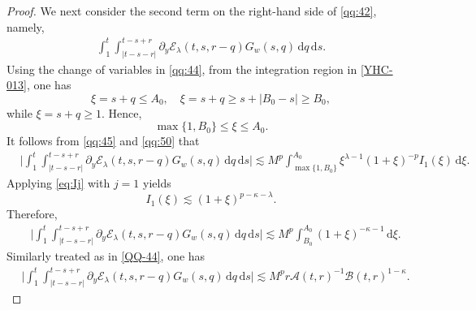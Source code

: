 \documentclass[11pt,twoside]{article}
\newcommand{\Acal}{\mathcal A}
\newcommand{\Bcal}{\mathcal B}
\newcommand{\dd}{\,\mathrm{d}}
\newcommand{\Ecal}{\mathcal E}
\theoremstyle{plain}
\theoremstyle{definition}
\theoremstyle{remark}
\numberwithin{equation}{section}
\begin{document}
\begin{proof}
We next consider the second term on the right-hand side of
\eqref{qq:42}, namely,
\begin{equation}\label{YHC-013}
\begin{aligned}
\int_1^t
\int_{|t-s-r|}^{t-s+r}
\partial_y\Ecal_\lambda(t,s,r-q)
G_w(s,q)\dd q\dd s .
\end{aligned}
\end{equation}
Using the change of variables in \eqref{qq:44},  from the integration region in \eqref{YHC-013}, one has
\[
\xi=s+q\leq A_0,
\quad
\xi=s+q\geq s+|B_0-s|\geq B_0,
\]
while $\xi=s+q\geq1$. Hence,
\[
\max\{1,B_0\}\leq\xi\leq A_0.
\]
It follows from \eqref{qq:45} and \eqref{qq:50} that
\begin{equation}
\label{qq:62}
\begin{aligned}
&
\big|
\int_1^t
\int_{|t-s-r|}^{t-s+r}
\partial_y\Ecal_\lambda(t,s,r-q)
G_w(s,q)\dd q\dd s
\big|
\lesssim
M^p
\int_{\max\{1,B_0\}}^{A_0}
\xi^{\lambda-1}
(1+\xi)^{-p}
I_1(\xi)
\dd\xi .
\end{aligned}
\end{equation}
Applying \eqref{eq:Ij} with $j=1$ yields
\[
I_1(\xi)
\lesssim
(1+\xi)^{p-\kappa-\lambda}.
\]
Therefore,
\begin{equation}
\label{qq:63}
\begin{aligned}
&
\big|
\int_1^t
\int_{|t-s-r|}^{t-s+r}
\partial_y\Ecal_\lambda(t,s,r-q)
G_w(s,q)\dd q\dd s
\big|
\lesssim
M^p
\int_{B_0}^{A_0}
(1+\xi)^{-\kappa-1}
\dd\xi .
\end{aligned}
\end{equation}
Similarly treated as in \eqref{QQ-44}, one has
\begin{equation}
\label{qq:64}
\begin{aligned}
&
\big|
\int_1^t
\int_{|t-s-r|}^{t-s+r}
\partial_y\Ecal_\lambda(t,s,r-q)
G_w(s,q)\dd q\dd s
\big|
\lesssim
M^p
r\Acal(t,r)^{-1}
\Bcal(t,r)^{1-\kappa}.
\end{aligned}
\end{equation}


\end{proof}
\end{document}
